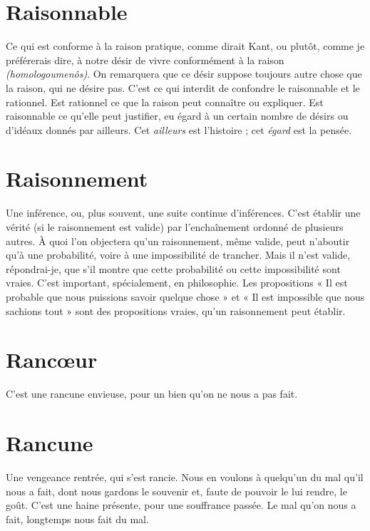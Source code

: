 \section{Raisonnable}
Ce qui est conforme à la raison pratique, comme dirait
Kant, ou plutôt, comme je préférerais dire, à notre désir de
vivre conformément à la raison {\it (homologoumenôs)}. On remarquera que ce désir
suppose toujours autre chose que la raison, qui ne désire pas. C’est ce qui
interdit de confondre le raisonnable et le rationnel. Est rationnel ce que la
raison peut connaître ou expliquer. Est raisonnable ce qu’elle peut justifier, eu
égard à un certain nombre de désirs ou d’idéaux donnés par ailleurs. Cet
{\it ailleurs} est l’histoire ; cet {\it égard} est la pensée.

\section{Raisonnement}
Une inférence, ou, plus souvent, une suite continue d’inférences.
C’est établir une vérité (si le raisonnement est
valide) par l’enchaînement ordonné de plusieurs autres. À quoi l’on objectera
qu’un raisonnement, même valide, peut n’aboutir qu’à une probabilité, voire à
une impossibilité de trancher. Mais il n’est valide, répondrai-je, que s’il montre
que cette probabilité ou cette impossibilité sont vraies. C’est important, spécialement,
en philosophie. Les propositions « Il est probable que nous puissions
savoir quelque chose » et « Il est impossible que nous sachions tout » sont des
propositions vraies, qu’un raisonnement peut établir.

\section{Ranc{\oe}ur}
C'est une rancune envieuse, pour un bien qu’on ne nous a pas
fait.

\section{Rancune}
Une vengeance rentrée, qui s’est rancie. Nous en voulons à
quelqu'un du mal qu’il nous a fait, dont nous gardons le souvenir
et, faute de pouvoir le lui rendre, le goût. C’est une haine présente, pour
une souffrance passée. Le mal qu’on nous a fait, longtemps nous fait du mal.

